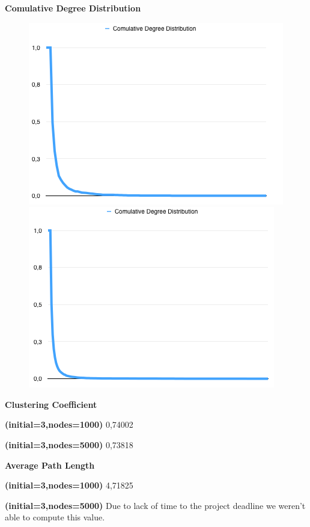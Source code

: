 \documentclass[a4paper,titlepage,11pt]{article}
\begin{document}
\textbf{Comulative Degree Distribution}

\begin{figure}[h]
    \centering
    \includegraphics[scale=0.50]{img/cdd-minimal-3-1000.png}
    \includegraphics[scale=0.50]{img/cdd-minimal-3-5000.png}
\end{figure}

\begin{multicols}{2}

  \textbf{Clustering Coefficient}

  \textbf{(initial=3,nodes=1000)} 0,74002

  \textbf{(initial=3,nodes=5000)} 0,73818

\columnbreak

  \textbf{Average Path Length}

  \textbf{(initial=3,nodes=1000)} 4,71825

  \textbf{(initial=3,nodes=5000)} Due to lack of time to the project deadline we weren't able to compute this value.

\end{multicols}
\end{document}

